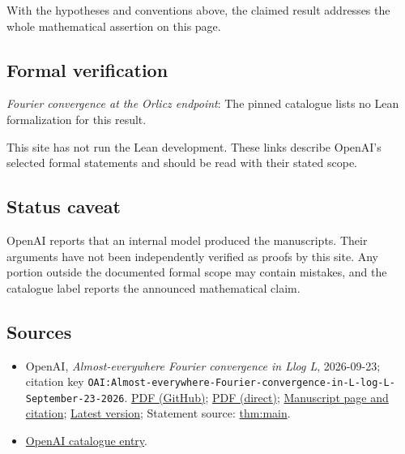 \documentclass[11pt]{article}
\begin{document}
With the hypotheses and conventions above, the claimed result addresses the whole mathematical assertion on this page.

\subsection{Formal verification}
\textit{Fourier convergence at the Orlicz endpoint}: The pinned catalogue lists no Lean formalization for this result.

This site has not run the Lean development. These links describe OpenAI’s selected formal statements and should be read with their stated scope.

\subsection{Status caveat}
OpenAI reports that an internal model produced the manuscripts. Their arguments have not been independently verified as proofs by this site. Any portion outside the documented formal scope may contain mistakes, and the catalogue label reports the announced mathematical claim.

\subsection{Sources}
\begin{itemize}
\item OpenAI, \emph{Almost-everywhere Fourier convergence in Llog L}, 2026-09-23; citation key \texttt{OAI:Almost-everywhere-Fourier-convergence-in-L-log-L-September-23-2026}. \href{https://github.com/openai/math/blob/adc7f1241b42e322a6451854ab7e4b4c146bf78a/preprints/Almost-everywhere-Fourier-convergence-in-L-log-L-September-23-2026/paper.pdf}{PDF (GitHub)}; \href{https://github.com/openai/math/raw/adc7f1241b42e322a6451854ab7e4b4c146bf78a/preprints/Almost-everywhere-Fourier-convergence-in-L-log-L-September-23-2026/paper.pdf}{PDF (direct)}; \href{https://github.com/openai/math/blob/adc7f1241b42e322a6451854ab7e4b4c146bf78a/preprints/Almost-everywhere-Fourier-convergence-in-L-log-L-September-23-2026/README.md}{Manuscript page and citation}; \href{https://github.com/openai/math/blob/main/preprints/Almost-everywhere-Fourier-convergence-in-L-log-L-September-23-2026/paper.pdf}{Latest version}; Statement source: \href{https://github.com/openai/math/blob/adc7f1241b42e322a6451854ab7e4b4c146bf78a/preprints/Almost-everywhere-Fourier-convergence-in-L-log-L-September-23-2026/build/sections/01-introduction.tex\#L17}{thm:main}.
\item \href{https://github.com/openai/math/blob/adc7f1241b42e322a6451854ab7e4b4c146bf78a/CONTENTS.md}{OpenAI catalogue entry}.
\end{itemize}
\end{document}

